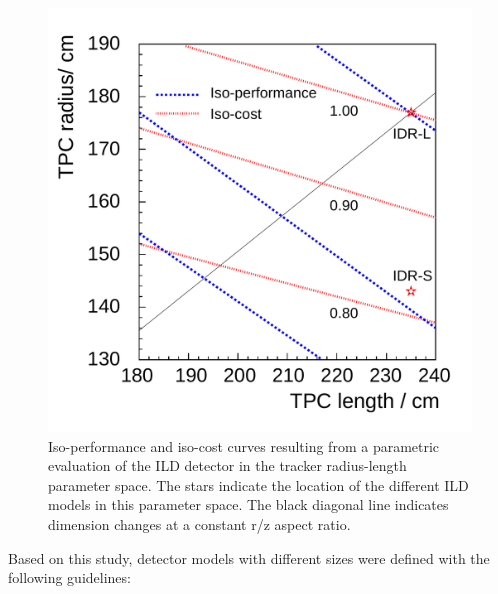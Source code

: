 \begin{figure}[t!]
\centering
\includegraphics[width=0.5\hsize]{ILD/fig/aspect_ratio.pdf}
\caption{Iso-performance and iso-cost curves resulting from a parametric evaluation of the ILD detector in the tracker radius-length parameter space. The stars indicate the location of the different ILD models in this parameter space. The black diagonal line indicates dimension changes at a constant r/z aspect ratio.}
\label{fig:ILD:aspect_ratio}
\end{figure}

Based on this study, detector models with different sizes were defined with the following guidelines:


